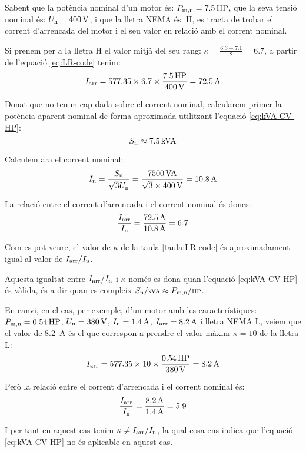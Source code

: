 \begin{exemple}
    Sabent que la  potència nominal d'un motor és: $P\ped{m,n} = \SI{7,5}{HP}$,    que la seva tensió nominal és: $U\ped{n}=\SI{400}{V}$, i que la lletra NEMA és: H, es tracta de trobar el corrent d'arrencada  del  motor i el seu valor en relació amb el corrent nominal.

    Si prenem per a la lletra H el valor mitjà del seu rang: $\kappa = \frac{\num{6,3}+\num{7,1}}{2}=\num{6,7}$, a partir de l'equació  \eqref{eq:LR-code} tenim:
    \[
      I\ped{arr} = \num{577,35} \times \num{6,7} \times \frac{\SI{7,5}{HP}}{\SI{400}{V}} = \SI{72,5}{A}
    \]

    Donat que no tenim cap dada sobre el corrent nominal, calcularem primer la potència aparent nominal de forma aproximada utilitzant l'equació \eqref{eq:kVA-CV-HP}:
    \[
        S\ped{n} \approx \SI{7,5}{kVA}
    \]

    Calculem ara el corrent nominal:
    \[
        I\ped{n}= \frac{S\ped{n}}{\sqrt{3} U\ped{n}} = \frac{\SI{7500}{VA}}{\sqrt{3}\times\SI{400}{V}} = \SI{10,8}{A}
    \]

    La relació entre el corrent d'arrencada i el corrent nominal és doncs:
    \[
        \frac{I\ped{arr}}{I\ped{n}} = \frac{\SI{72,5}{A}}{\SI{10,8}{A}} = \num{6,7}
    \]

    Com es pot veure, el valor  de $\kappa$ de la taula \vref{taula:LR-code} és aproximadament igual al valor de $I\ped{arr}/I\ped{n}$.

    Aquesta igualtat entre $I\ped{arr}/I\ped{n}$ i $\kappa$ només es dona quan l'equació \eqref{eq:kVA-CV-HP} és vàlida, és a dir quan es compleix $S\ped{n}/{\scriptstyle \si{kVA}} \approx  P\ped{m,n}/{\scriptstyle \si{HP}}$.

    En canvi, en el cas, per exemple, d'un motor amb les característiques: $P\ped{m,n} = \SI{0,54}{HP}$, $U\ped{n} = \SI{380}{V}$, $I\ped{n} = \SI{1,4}{A}$, $I\ped{arr} = \SI{8,2}{A}$ i lletra NEMA L, veiem que el valor de \SI{8,2}{A} és el que correspon a prendre  el valor màxim $\kappa = 10$ de la lletra L:
    \[
      I\ped{arr} = \num{577,35} \times 10 \times \frac{\SI{0,54}{HP}}{\SI{380}{V}} = \SI{8,2}{A}
    \]

    Però la relació entre el corrent d'arrencada i el corrent nominal és:
    \[
        \frac{I\ped{arr}}{I\ped{n}} = \frac{\SI{8,2}{A}}{\SI{1,4}{A}} = \num{5,9}
    \]

    I per tant  en aquest cas tenim $\kappa \neq I\ped{arr}/I\ped{n}$, la qual cosa ens indica que l'equació \eqref{eq:kVA-CV-HP} no és aplicable en aquest cas.
\end{exemple}

